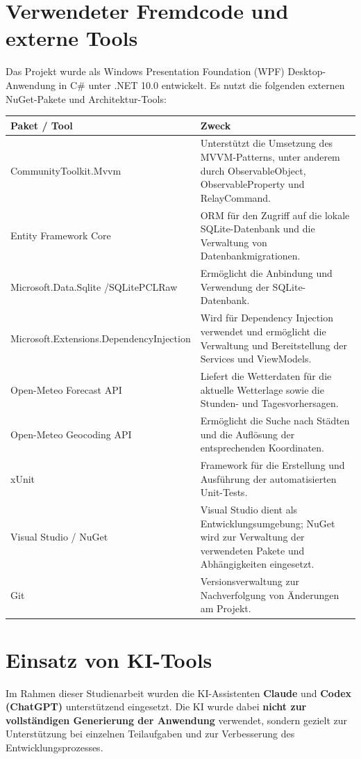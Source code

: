 \documentclass[12pt,a4paper]{article}
\begin{document}
\section{Verwendeter Fremdcode und externe Tools}
Das Projekt wurde als Windows Presentation Foundation (WPF)
Desktop-Anwendung in C\# unter .NET 10.0 entwickelt. Es nutzt die
folgenden externen NuGet-Pakete und Architektur-Tools:

\vspace{1em}
\noindent
\renewcommand{\arraystretch}{1.3}
\begin{tabular}{|p{4.5cm}|p{11.5cm}|}
  \hline
  \textbf{Paket / Tool} & \textbf{Zweck} \\
  \hline
  CommunityToolkit.\newline Mvvm & Unterstützt die Umsetzung des MVVM-Patterns,
  unter anderem durch ObservableObject, ObservableProperty und
  RelayCommand. \\
  \hline
  Entity Framework Core & ORM für den Zugriff auf die lokale
  SQLite-Datenbank und die Verwaltung von Datenbankmigrationen. \\
  \hline
  Microsoft.Data.Sqlite /\newline SQLitePCLRaw & Ermöglicht die Anbindung und
  Verwendung der SQLite-Datenbank. \\
  \hline
  Microsoft.Extensions.\newline DependencyInjection & Wird für Dependency
  Injection verwendet und ermöglicht die Verwaltung und Bereitstellung
  der Services und ViewModels. \\
  \hline
  Open-Meteo Forecast API & Liefert die Wetterdaten für die aktuelle
  Wetterlage sowie die Stunden- und Tagesvorhersagen. \\
  \hline
  Open-Meteo Geocoding API & Ermöglicht die Suche nach Städten und die
  Auflösung der entsprechenden Koordinaten. \\
  \hline
  xUnit & Framework für die Erstellung und Ausführung der
  automatisierten Unit-Tests. \\
  \hline
  Visual Studio / NuGet & Visual Studio dient als Entwicklungsumgebung;
  NuGet wird zur Verwaltung der verwendeten Pakete und Abhängigkeiten
  eingesetzt. \\
  \hline
  Git & Versionsverwaltung zur Nachverfolgung von Änderungen am
  Projekt. \\
  \hline
\end{tabular}

\newpage
\section{Einsatz von KI-Tools}
Im Rahmen dieser Studienarbeit wurden die KI-Assistenten \textbf{Claude}
und \textbf{Codex (ChatGPT)} unterstützend eingesetzt. Die KI wurde
dabei \textbf{nicht zur vollständigen Generierung der Anwendung}
verwendet, sondern gezielt zur Unterstützung bei einzelnen Teilaufgaben
und zur Verbesserung des Entwicklungsprozesses.
\end{document}
